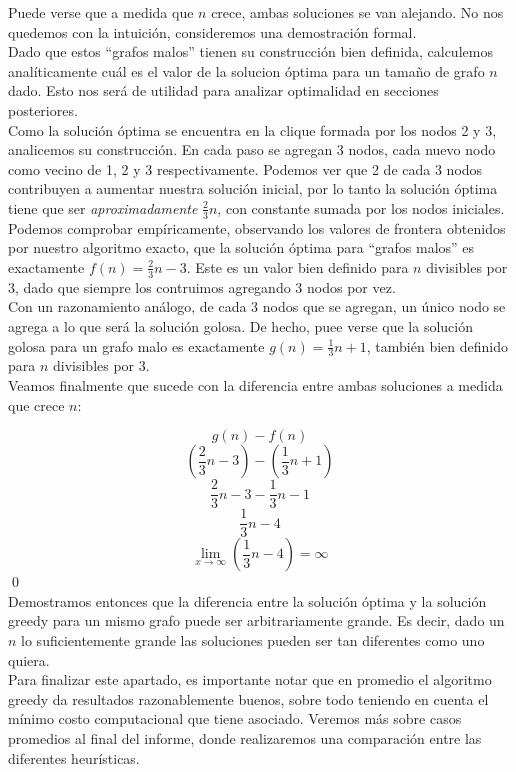 Puede verse que a medida que $n$ crece, ambas soluciones se van alejando. No nos quedemos con la intuición, consideremos una demostración formal. \\

Dado que estos ``grafos malos'' tienen su construcción bien definida, calculemos analíticamente cuál es el valor de la solucion óptima para un tamaño de grafo $n$ dado. Esto nos será de utilidad para analizar optimalidad en secciones posteriores. \\

Como la solución óptima se encuentra en la clique formada por los nodos 2 y 3, analicemos su construcción. En cada paso se agregan 3 nodos, cada nuevo nodo como vecino de 1, 2 y 3 respectivamente. Podemos ver que 2 de cada 3 nodos contribuyen a aumentar nuestra solución inicial, por lo tanto la solución óptima tiene que ser \textit{aproximadamente} $\frac{2}{3}n$, con constante sumada por los nodos iniciales. \\

Podemos comprobar empíricamente, observando los valores de frontera obtenidos por nuestro algoritmo exacto, que la solución óptima para ``grafos malos'' es exactamente $f(n) = \frac{2}{3}n - 3$. Este es un valor bien definido para $n$ divisibles por 3, dado que siempre los contruimos agregando 3 nodos por vez. \\

Con un razonamiento análogo, de cada 3 nodos que se agregan, un único nodo se agrega a lo que será la solución golosa. De hecho, puee verse que la solución golosa para un grafo malo es exactamente $g(n) = \frac{1}{3}n + 1$, también bien definido para $n$ divisibles por 3. \\

Veamos finalmente que sucede con la diferencia entre ambas soluciones a medida que crece $n$:

$$g(n) - f(n)$$
$$(\frac{2}{3}n - 3) - (\frac{1}{3}n + 1)$$
$$\frac{2}{3}n - 3 - \frac{1}{3}n - 1$$
$$\frac{1}{3}n - 4$$
\[ \lim_{x \to \infty} (\frac{1}{3}n - 4) = \infty \] \qed \\

Demostramos entonces que la diferencia entre la solución óptima y la solución greedy para un mismo grafo puede ser arbitrariamente grande. Es decir, dado un $n$ lo suficientemente grande las soluciones pueden ser tan diferentes como uno quiera. \\

Para finalizar este apartado, es importante notar que en promedio el algoritmo greedy da resultados razonablemente buenos, sobre todo teniendo en cuenta el mínimo costo computacional que tiene asociado. Veremos más sobre casos promedios al final del informe, donde realizaremos una comparación entre las diferentes heurísticas. \\
